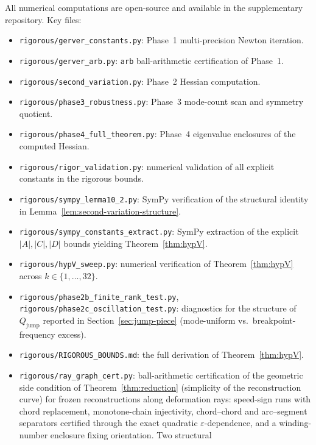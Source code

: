 \documentclass[11pt]{amsart}
\theoremstyle{plain}
\theoremstyle{definition}
\begin{document}
All numerical computations are open-source and available in the
supplementary repository.  Key files:
\begin{itemize}
  \item \texttt{rigorous/gerver\_constants.py}: Phase~1
        multi-precision Newton iteration.
  \item \texttt{rigorous/gerver\_arb.py}: \texttt{arb} ball-arithmetic
        certification of Phase~1.
  \item \texttt{rigorous/second\_variation.py}: Phase~2 Hessian
        computation.
  \item \texttt{rigorous/phase3\_robustness.py}: Phase~3 mode-count
        scan and symmetry quotient.
  \item \texttt{rigorous/phase4\_full\_theorem.py}: Phase~4
        eigenvalue enclosures of the computed Hessian.
  \item \texttt{rigorous/rigor\_validation.py}: numerical validation
        of all explicit constants in the rigorous bounds.
  \item \texttt{rigorous/sympy\_lemma10\_2.py}: SymPy verification of
        the structural identity in
        Lemma~\ref{lem:second-variation-structure}.
  \item \texttt{rigorous/sympy\_constants\_extract.py}: SymPy extraction
        of the explicit $|A|,|C|,|D|$ bounds yielding
        Theorem~\ref{thm:hypV}.
  \item \texttt{rigorous/hypV\_sweep.py}: numerical verification of
        Theorem~\ref{thm:hypV} across $k \in \{1, \ldots, 32\}$.
  \item \texttt{rigorous/phase2b\_finite\_rank\_test.py},
        \texttt{rigorous/phase2c\_oscillation\_test.py}: diagnostics
        for the structure of $Q_{\mathrm{jump}}$ reported in
        Section~\ref{sec:jump-piece} (mode-uniform vs.\
        breakpoint-frequency excess).
  \item \texttt{rigorous/RIGOROUS\_BOUNDS.md}: the full derivation of
        Theorem~\ref{thm:hypV}.
  \item \texttt{rigorous/ray\_graph\_cert.py}: ball-arithmetic
        certification of the geometric side condition of
        Theorem~\ref{thm:reduction} (simplicity of the reconstruction
        curve) for frozen reconstructions along deformation rays:
        speed-sign runs with chord replacement, monotone-chain
        injectivity, chord--chord and arc--segment separators certified
        through the exact quadratic $\varepsilon$-dependence, and a
        winding-number enclosure fixing orientation.  Two structural

\end{itemize}
\end{document}
